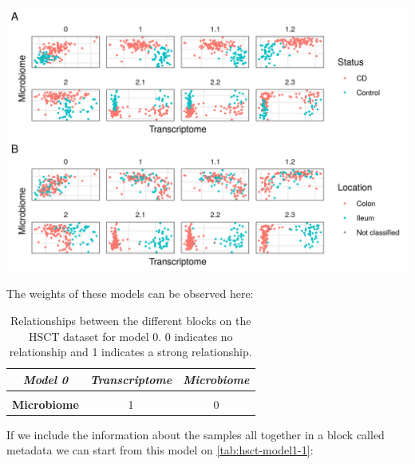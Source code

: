 \documentclass[
  12pt,
  a4paper,
  twoside,
  openright]{book}
\let\origfigure\figure
\let\endorigfigure\endfigure
\renewenvironment{figure}[1][2] {
    \expandafter\origfigure\expandafter[!ht]
} {
    \endorigfigure
}
\begin{document}
\begin{figure}
\includegraphics[width=1\linewidth]{images/hsct-models} \caption[Models on the HSCT dataset.]{On the abscissa the transcriptome, on the ordinate the Microbiome. Each square represents a different model of the HSCT dataset. On panel A colored by disease status, on panel B colored by sample location. Model 0 has only transcriptome and microbiome data, models 1 to 1.2 with data about the samples and models 2.1 to 2.3 with data about the samples split in 3 blocks.}\label{fig:hsct-models}
\end{figure}

The weights of these models can be observed here:

\begin{table}[H]

\caption[Model 0 of HSCT dataset.]{\label{tab:hsct-model0}Relationships between the different blocks on the HSCT dataset for model 0. 0 indicates no relationship and 1 indicates a strong relationship.}
\centering
\begin{tabular}[t]{|>{}c|c|>{}c|}
\hline
\em{\textbf{Model 0}} & \em{\textbf{Transcriptome}} & \em{\textbf{Microbiome}}\\
\hline
\textbf{\cellcolor{gray!6}{Transcriptome}} & \cellcolor{gray!6}{0} & \cellcolor{gray!6}{1}\\
\hline
\textbf{Microbiome} & 1 & 0\\
\hline
\end{tabular}
\end{table}

If we include the information about the samples all together in a block called metadata we can start from this model on \ref{tab:hsct-model1-1}:
\end{document}
